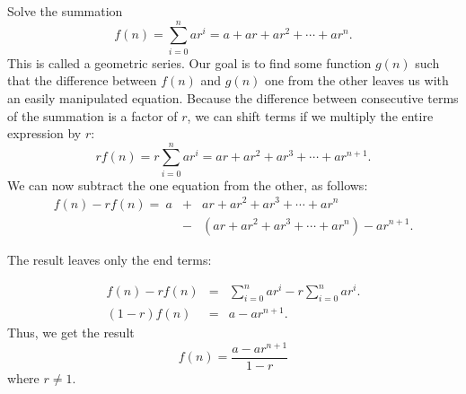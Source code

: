 \begin{example}
Solve the summation
\[f(n) = \sum_{i=0}^{n} ar^i = a + ar + ar^2 + \cdots + ar^n.\]
\noindent This is called a geometric series.
Our goal is to find some function \(g(n)\) such
that the difference between \(f(n)\) and \(g(n)\) one from the other
leaves us with an easily manipulated equation.
Because the difference between consecutive terms of the summation is a
factor of \(r\), we can shift terms if we multiply the entire
expression by \(r\):
\[rf(n) = r\sum_{i=0}^{n} ar^i = ar + ar^2 + ar^3 + \cdots + ar^{n+1}.\]
\noindent We can now subtract the one equation from the other, as follows:
\begin{eqnarray*}
f(n) - rf(n) =~a &+& ar + ar^2 + ar^3 + \cdots + ar^{n}\\
                 &-& (ar + ar^2 + ar^3 + \cdots + ar^n) - ar^{n+1}.
\end{eqnarray*}

\noindent The result leaves only the end terms: 

\vspace{-\bigskipamount}
\vspace{-\bigskipamount}

\begin{eqnarray*}
f(n) - rf(n) & = & \sum_{i=0}^{n} ar^i - r\sum_{i=0}^{n} ar^i.\\
(1-r)f(n)    & = & a - ar^{n+1}.
\end{eqnarray*}
\noindent Thus, we get the result
\[f(n) = \frac{a - ar^{n+1}}{1 - r}\]
\noindent where \( r \neq 1. \)
\end{example}

